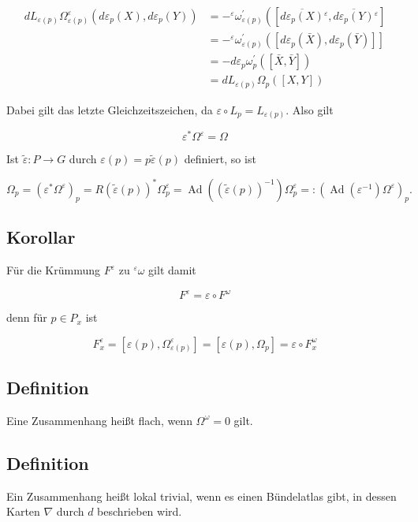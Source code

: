 \documentclass[10pt, letterpaper]{article}
\begin{document}
$$
\begin{aligned}
d L_{\varepsilon(p)} \Omega_{\varepsilon(p)}^{\varepsilon}\left(d \varepsilon_{p}(X), d \varepsilon_{p}(Y)\right) & =-{ }^{\varepsilon} \omega_{\varepsilon(p)}^{\prime}\left(\left[\overline{d \varepsilon_{p}(X)}{ }^{\varepsilon}, \overline{d \varepsilon_{p}(Y)}{ }^{\varepsilon}\right]\right. \\
& =-{ }^{\varepsilon} \omega_{\varepsilon(p)}^{\prime}\left(\left[d \varepsilon_{p}(\bar{X}), d \varepsilon_{p}(\bar{Y})\right]\right] \\
& =-d \varepsilon_{p} \omega_{p}^{\prime}([\bar{X}, \bar{Y}]) \\
& =d L_{\varepsilon(p)} \Omega_{p}([X, Y])
\end{aligned}
$$

Dabei gilt das letzte Gleichzeitszeichen, da $\varepsilon \circ L_{p}=L_{\varepsilon(p)}$. Also gilt

$$
\varepsilon^{*} \Omega^{\varepsilon}=\Omega
$$

Ist $\tilde{\varepsilon}: P \rightarrow G$ durch $\varepsilon(p)=p \tilde{\varepsilon}(p)$ definiert, so ist

$$
\Omega_{p}=\left(\varepsilon^{*} \Omega^{\varepsilon}\right)_{p}=R(\tilde{\varepsilon}(p))^{*} \Omega_{p}^{\varepsilon}=\operatorname{Ad}\left((\tilde{\varepsilon}(p))^{-1}\right) \Omega_{p}^{\varepsilon}=:\left(\operatorname{Ad}\left(\varepsilon^{-1}\right) \Omega^{\varepsilon}\right)_{p} .
$$

\subsection*{Korollar}
Für die Krümmung $F^{\varepsilon}$ zu ${ }^{\varepsilon} \omega$ gilt damit

$$
F^{\varepsilon}=\varepsilon \circ F^{\omega}
$$

denn für $p \in P_{x}$ ist

$$
F_{x}^{\varepsilon}=\left[\varepsilon(p), \Omega_{\varepsilon(p)}^{\varepsilon}\right]=\left[\varepsilon(p), \Omega_{p}\right]=\varepsilon \circ F_{x}^{\omega}
$$

\subsection*{Definition}
Eine Zusammenhang heißt flach, wenn $\Omega^{\omega}=0$ gilt.

\subsection*{Definition}
Ein Zusammenhang heißt lokal trivial, wenn es einen Bündelatlas gibt, in dessen Karten $\nabla$ durch $d$ beschrieben wird.
\end{document}
